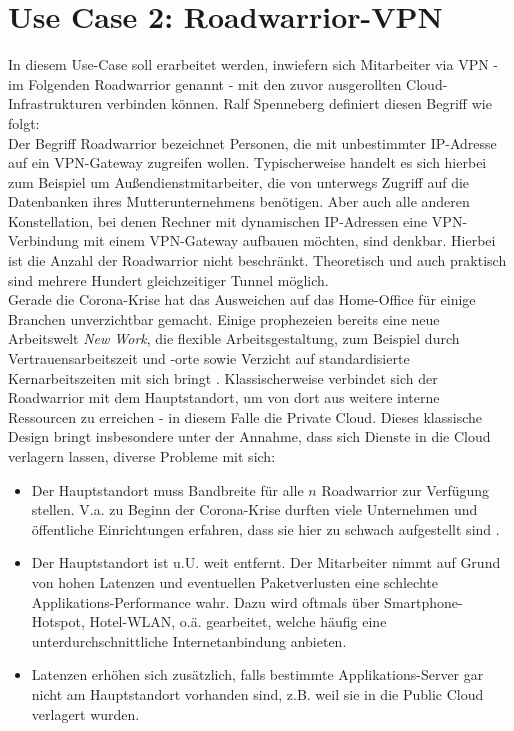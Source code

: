 \section{Use Case 2: Roadwarrior-VPN}
In diesem Use-Case soll erarbeitet werden, inwiefern sich Mitarbeiter via VPN - im Folgenden Roadwarrior genannt - mit den zuvor ausgerollten Cloud-Infrastrukturen verbinden können. Ralf Spenneberg definiert diesen Begriff wie folgt:\\
\glqq Der Begriff Roadwarrior bezeichnet Personen, die mit unbestimmter IP-Adresse auf ein VPN-Gateway zugreifen wollen. Typischerweise handelt es sich hierbei zum Beispiel um Außendienstmitarbeiter, die von unterwegs Zugriff auf die Datenbanken ihres Mutterunternehmens benötigen. Aber auch alle anderen Konstellation, bei denen Rechner mit dynamischen IP-Adressen eine VPN-Verbindung mit einem VPN-Gateway aufbauen möchten, sind denkbar. Hierbei ist die Anzahl der Roadwarrior nicht beschränkt. Theoretisch und auch praktisch sind mehrere Hundert gleichzeitiger Tunnel möglich.\grqq{} \cite[S. 199]{Spenneberg2010}\\
Gerade die Corona-Krise hat das Ausweichen auf das Home-Office für einige Branchen unverzichtbar gemacht. Einige prophezeien bereits eine neue Arbeitswelt \textit{New Work}, die \glqq flexible Arbeitsgestaltung, zum Beispiel durch Vertrauensarbeitszeit und -orte sowie Verzicht auf standardisierte Kernarbeitszeiten\grqq{} mit sich bringt \cite{Umbs2020}.
Klassischerweise verbindet sich der Roadwarrior mit dem Hauptstandort, um von dort aus weitere interne Ressourcen zu erreichen - in diesem Falle die Private Cloud. Dieses klassische Design bringt insbesondere unter der Annahme, dass sich Dienste in die Cloud verlagern lassen, diverse Probleme mit sich:
\begin{itemize}
\item Der Hauptstandort muss Bandbreite für alle $n$ Roadwarrior zur Verfügung stellen. V.a. zu Beginn der Corona-Krise durften viele Unternehmen und öffentliche Einrichtungen erfahren, dass sie hier zu schwach aufgestellt sind \cite{tufreiberg2021}.
\item Der Hauptstandort ist u.U. weit entfernt. Der Mitarbeiter nimmt auf Grund von hohen Latenzen und eventuellen Paketverlusten eine schlechte Applikations-Performance wahr. Dazu wird oftmals über Smartphone-Hotspot, Hotel-WLAN, o.ä. gearbeitet, welche häufig eine unterdurchschnittliche Internetanbindung anbieten.
\item Latenzen erhöhen sich zusätzlich, falls bestimmte Applikations-Server gar nicht am Hauptstandort vorhanden sind, z.B. weil sie in die Public Cloud verlagert wurden.
\end{itemize}
